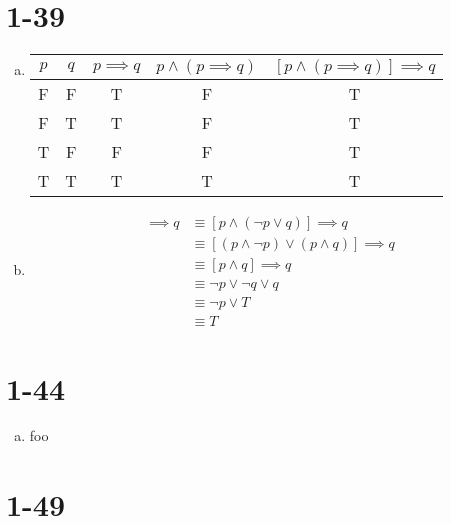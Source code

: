 \documentclass{article}
\begin{document}
\section{1-39}

\begin{enumerate}[a)]
    \item
        \begin{tabular}{ |c|c|c|c|c| }
            \hline
                $p$ & $q$ & $p \implies q$ & $p \land (p \implies q)$ & $[p \land (p \implies q)] \implies q$ \\
            \hline
                F   & F   & T              & F                        & T                                   \\
                F   & T   & T              & F                        & T                                   \\
                T   & F   & F              & F                        & T                                   \\
                T   & T   & T              & T                        & T                                   \\
            \hline
        \end{tabular}

    \item
        \begin{align*}
            [p \land (p \implies q)] \implies q
            &\equiv [p \land (\neg p \lor q)] \implies q \\
            &\equiv [(p \land \neg p) \lor (p \land q)] \implies q \\
            &\equiv [p \land q] \implies q \\
            &\equiv \neg p \lor \neg q \lor q \\
            &\equiv \neg p \lor T \\
            &\equiv T
        \end{align*}

\end{enumerate}

\section{1-44}

\begin{enumerate}[a)]
    \item foo
\end{enumerate}

\section{1-49}
\end{document}
